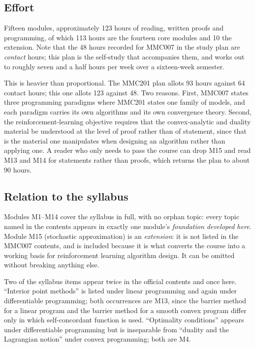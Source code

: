 \documentclass[11pt,a4paper]{article}
\begin{document}
\subsection*{Effort}

Fifteen modules, approximately 123 hours of reading, written proofs and programming, of which
113 hours are the fourteen core modules and 10 the extension. Note that the 48 hours recorded
for MMC007 in the study plan are \emph{contact} hours; this plan is the self-study that
accompanies them, and works out to roughly seven and a half hours per week over a sixteen-week
semester.

This is heavier than proportional. The MMC201 plan allots 93 hours against 64 contact hours;
this one allots 123 against 48. Two reasons. First, MMC007 states three programming
paradigms where MMC201 states one family of models, and each paradigm carries its own
algorithms and its own convergence theory. Second, the reinforcement-learning objective
requires that the convex-analytic and duality material be understood at the level of proof
rather than of statement, since that is the material one manipulates when designing an
algorithm rather than applying one. A reader who only needs to pass the course can drop M15
and read M13 and M14 for statements rather than proofs, which returns the plan to about 90
hours.

\subsection*{Relation to the syllabus}

Modules M1--M14 cover the syllabus in full, with no orphan topic: every topic named in
the contents appears in exactly one module's \emph{foundation developed here}. Module M15
(stochastic approximation) is an \emph{extension}: it is not listed in the MMC007 contents,
and is included because it is what converts the course into a working basis for
reinforcement learning algorithm design. It can be omitted without breaking anything else.

Two of the syllabus items appear twice in the official contents and once here. ``Interior
point methods'' is listed under linear programming and again under differentiable
programming; both occurrences are M13, since the barrier method for a linear program and the
barrier method for a smooth convex program differ only in which self-concordant function is
used. ``Optimality conditions'' appears under differentiable programming but is inseparable
from ``duality and the Lagrangian notion'' under convex programming; both are M4.
\end{document}
